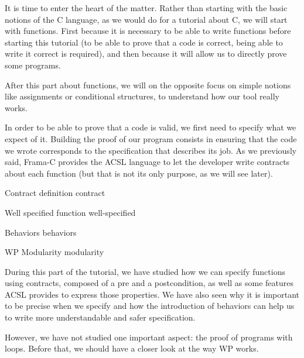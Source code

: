 It is time to enter the heart of the matter. Rather than starting with
the basic notions of the C language, as we would do for a tutorial about C,
we will start with functions. First because it is necessary to be able
to write functions before starting this tutorial (to be able to prove
that a code is correct, being able to write it correct is required), and
then because it will allow us to directly prove some programs.



After this part about functions, we will on the opposite focus on simple
notions like assignments or conditional structures, to understand how our
tool really works.



In order to be able to prove that a code is valid, we first need to
specify what we expect of it. Building the proof of our program consists
in ensuring that the code we wrote corresponds to the specification that
describes its job. As we previously said, Frama-C provides the ACSL
language to let the developer write contracts about each function (but
that is not its only purpose, as we will see later).



\begin{levelTwo}
  {Contract definition}
  {contract}
\end{levelTwo}

\begin{levelTwo}
  {Well specified function}
  {well-specified}
\end{levelTwo}

\begin{levelTwo}
  {Behaviors}
  {behaviors}
\end{levelTwo}

\begin{levelTwo}
  {WP Modularity}
  {modularity}
\end{levelTwo}


\horizontalLine
\newpage


During this part of the tutorial, we have studied how we can specify
functions using contracts, composed of a pre and a postcondition, as
well as some features ACSL provides to express those properties. We have
also seen why it is important to be precise when we specify and how the
introduction of behaviors can help us to write more understandable and
safer specification.

However, we have not studied one important aspect: the proof of programs
with loops. Before that, we should have a closer look at the way WP works.
